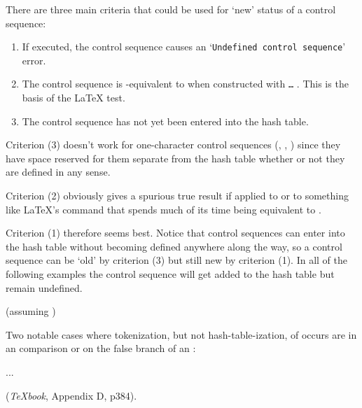 There are three main criteria that could be used for `new' status of a
control sequence:
\begin{enumerate}
\item  If executed, the control sequence causes an `\texttt{Undefined control
sequence}' error.

\item The control sequence is -equivalent to \cmd{\relax} when constructed
with \cmd{\csname} \texttt{\ldots} \cmd{\endcsname}. This is the basis of the LaTeX
\cmd{\@ifundefined} test.

\item The control sequence has not yet been entered into the hash table.
\end{enumerate}

Criterion (3) doesn't work for one-character control sequences (\cmd{\a},
\cmd{\0}, \cmd{\:}) since they have space reserved for them separate from the
hash table whether or not they are defined in any sense.

Criterion (2) obviously gives a spurious true result if applied to
\cmd{\relax} or to something like LaTeX's \cmd{\protect} command that spends much
of its time being equivalent to \cmd{\relax}.

Criterion (1) therefore seems best. Notice that control sequences can
enter into the hash table without becoming defined anywhere along the
way, so a control sequence can be `old' by criterion (3) but still
new by criterion (1). In all of the following examples the control
sequence \cmd{\foo} will get added to the hash table but remain undefined.
\begin{lcode}
  \def\x{\foo}
  \string\foo
  \noexpand\foo
  \gobble\foo (assuming \def\gobble#1{})
  \uppercase{\iffalse\foo\fi}
  \show\foo
  \meaning\foo
\end{lcode}
Two notable cases where tokenization, but not hash-table-ization, of
\cmd{\foo} occurs are in an  comparison or on the false branch of an 
:
\begin{lcode}
  \ifx\foo\something...
  \iffalse\foo\fi
\end{lcode}
(\emph{TeXbook}, Appendix D, p384).

